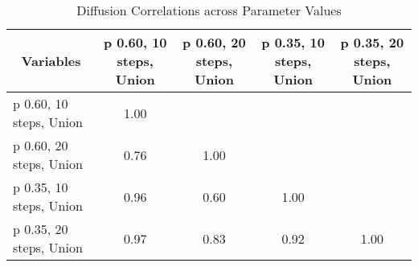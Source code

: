 \begin{table}[htbp]\centering \caption{Diffusion Correlations across Parameter Values\label{diffusion_corr}}
\begin{tabular}{l  c  c  c  c }\hline\hline
\multicolumn{1}{c}{Variables} &p 0.60, 10 steps, Union&p 0.60, 20 steps, Union&p 0.35, 10 steps, Union&p 0.35, 20 steps, Union\\ \hline
p 0.60, 10 steps, Union&1.00\\
p 0.60, 20 steps, Union&0.76&1.00\\
p 0.35, 10 steps, Union&0.96&0.60&1.00\\
p 0.35, 20 steps, Union&0.97&0.83&0.92&1.00\\
\hline \hline 
 \end{tabular}
\end{table}
